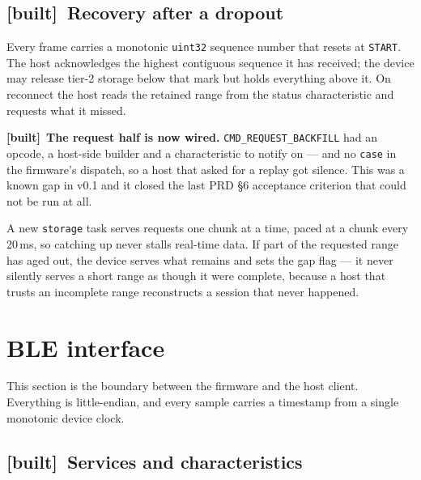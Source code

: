 \documentclass[11pt]{article}
\newcommand{\built}{{\sffamily\scriptsize\color{good}\textbf{[built]}}\ }
\begin{document}
\subsection{\built Recovery after a dropout}

Every frame carries a monotonic \texttt{uint32} sequence number that resets at
\texttt{START}. The host acknowledges the highest contiguous sequence it has
received; the device may release tier-2 storage below that mark but holds
everything above it. On reconnect the host reads the retained range from the
status characteristic and requests what it missed.

\begin{callout}
\built \textbf{The request half is now wired.}
\texttt{CMD\_REQUEST\_BACKFILL} had an opcode, a host-side builder and a
characteristic to notify on --- and no \texttt{case} in the firmware's
dispatch, so a host that asked for a replay got silence. This was a known gap
in v0.1 and it closed the last PRD \S6 acceptance criterion that could not be
run at all.

\medskip
A new \texttt{storage} task serves requests one chunk at a time, paced at a
chunk every 20\,ms, so catching up never stalls real-time data. If part of the
requested range has aged out, the device serves what remains and sets the gap
flag --- it never silently serves a short range as though it were complete,
because a host that trusts an incomplete range reconstructs a session that
never happened.
\end{callout}

\section{BLE interface}

This section is the boundary between the firmware and the host client.
Everything is little-endian, and every sample carries a timestamp from a
single monotonic device clock.

\subsection{\built Services and characteristics}
\end{document}
